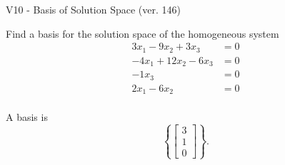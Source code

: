 \begin{exercise}
  \begin{exerciseTitle}V10 - Basis of Solution Space (ver. 146)\end{exerciseTitle}
  \begin{exerciseStatement}
    Find a basis for the solution space of the homogeneous system 
\begin{align*}
 3 x_ 1 -9 x_ 2 + 3 x_ 3 &= 0  \\ 
  -4 x_ 1 + 12 x_ 2 -6 x_ 3 &= 0  \\ 
  -1 x_ 3 &= 0  \\ 
  2 x_ 1 -6 x_ 2 &= 0  \\ 
 \end{align*}


 
  \end{exerciseStatement}

  \begin{exerciseAnswer}
   A basis is   
\[\left\{\left[\begin{array}{c}
3 \\
1 \\
0
\end{array}\right]\right\}.\]

  


  \end{exerciseAnswer}
\end{exercise}